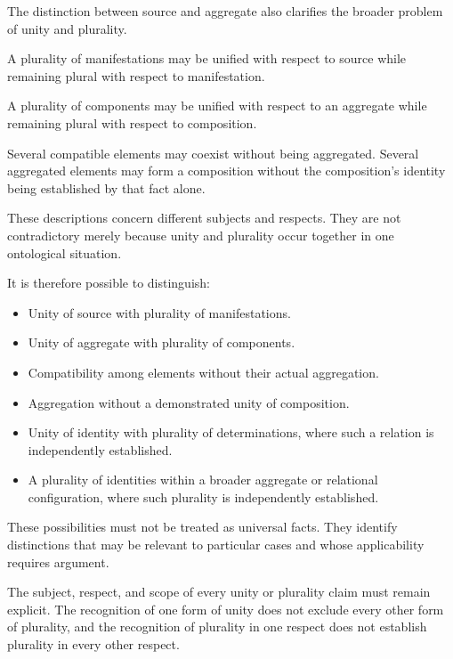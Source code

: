 The distinction between source and aggregate
also clarifies the broader problem of
unity and plurality.

A plurality of manifestations may be
unified with respect to source while
remaining plural with respect to
manifestation.

A plurality of components may be unified
with respect to an aggregate while
remaining plural with respect to
composition.

Several compatible elements may coexist
without being aggregated. Several
aggregated elements may form a composition
without the composition's identity
being established by that fact alone.

These descriptions concern different
subjects and respects. They are not
contradictory merely because unity
and plurality occur together in one
ontological situation.

It is therefore possible to distinguish:

\begin{itemize}
    \item Unity of source with plurality
    of manifestations.

    \item Unity of aggregate with plurality
    of components.

    \item Compatibility among elements
    without their actual aggregation.

    \item Aggregation without a demonstrated
    unity of composition.

    \item Unity of identity with plurality
    of determinations, where such a relation
    is independently established.

    \item A plurality of identities within
    a broader aggregate or relational
    configuration, where such plurality
    is independently established.
\end{itemize}

These possibilities must not be treated
as universal facts. They identify
distinctions that may be relevant to
particular cases and whose applicability
requires argument.

The subject, respect, and scope of every
unity or plurality claim must remain
explicit. The recognition of one form
of unity does not exclude every other
form of plurality, and the recognition
of plurality in one respect does not
establish plurality in every other respect.

